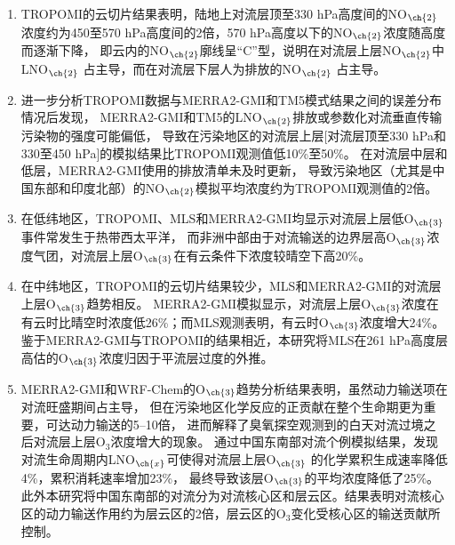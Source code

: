 \begin{enumerate}[label=（\arabic*）, labelindent=\parindent, nosep, leftmargin=0pt, widest=0, itemindent=*, topsep=0pt, partopsep=0pt, parsep=0pt]

\item TROPOMI的云切片结果表明，陆地上对流层顶至330 hPa高度间的NO$_{\ch{2}}$浓度约为450至570 hPa高度间的2倍，570 hPa高度以下的NO$_{\ch{2}}$浓度随高度而逐渐下降，
即云内的NO$_{\ch{2}}$廓线呈“C”型，说明在对流层上层NO$_{\ch{2}}$中LNO$_{\ch{2}}$ 占主导，而在对流层下层人为排放的NO$_{\ch{2}}$ 占主导。

\item 进一步分析TROPOMI数据与MERRA2-GMI和TM5模式结果之间的误差分布情况后发现，
MERRA2-GMI和TM5的LNO$_{\ch{2}}$排放或参数化对流垂直传输污染物的强度可能偏低，
导致在污染地区的对流层上层[对流层顶至330 hPa和330至450 hPa]的模拟结果比TROPOMI观测值低10\%至50\%。
在对流层中层和低层，MERRA2-GMI使用的排放清单未及时更新，
导致污染地区（尤其是中国东部和印度北部）的NO$_{\ch{2}}$模拟平均浓度约为TROPOMI观测值的2倍。

\item 在低纬地区，TROPOMI、MLS和MERRA2-GMI均显示对流层上层低O$_{\ch{3}}$事件常发生于热带西太平洋，
而非洲中部由于对流输送的边界层高O$_{\ch{3}}$浓度气团，对流层上层O$_{\ch{3}}$在有云条件下浓度较晴空下高20\%。

\item 在中纬地区，TROPOMI的云切片结果较少，MLS和MERRA2-GMI的对流层上层O$_{\ch{3}}$趋势相反。
MERRA2-GMI模拟显示，对流层上层O$_{\ch{3}}$浓度在有云时比晴空时浓度低26\%；而MLS观测表明，有云时O$_{\ch{3}}$浓度增大24\%。
鉴于MERRA2-GMI与TROPOMI的结果相近，本研究将MLS在261 hPa高度层高估的O$_{\ch{3}}$浓度归因于平流层过度的外推。

\item MERRA2-GMI和WRF-Chem的O$_{\ch{3}}$趋势分析结果表明，虽然动力输送项在对流旺盛期间占主导，
但在污染地区化学反应的正贡献在整个生命期更为重要，可达动力输送的5--10倍，
进而解释了臭氧探空观测到的白天对流过境之后对流层上层O$_3$浓度增大的现象。
通过中国东南部对流个例模拟结果，发现对流生命周期内LNO$_{\ch{x}}$可使得对流层上层O$_{\ch{3}}$
的化学累积生成速率降低4\%，累积消耗速率增加23\%，
最终导致该层O$_{\ch{3}}$的平均浓度降低了25\%。
此外本研究将中国东南部的对流分为对流核心区和层云区。结果表明对流核心区的动力输送作用约为层云区的2倍，层云区的O$_3$变化受核心区的输送贡献所控制。

\end{enumerate}
